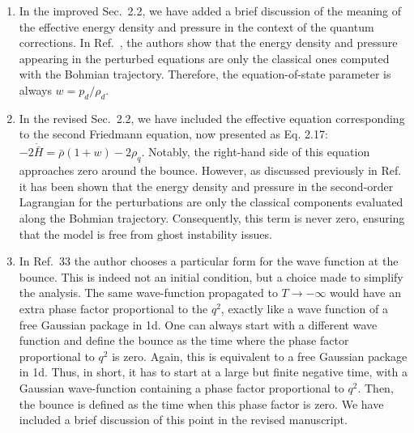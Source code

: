 \documentclass[a4paper,11pt]{article}
\begin{document}
\begin{enumerate}
\begin{enumerate}
              \item In the improved Sec.~2.2, we have added a brief discussion of the
                    meaning of the effective energy density and pressure in the context
                    of the quantum corrections. In Ref.~\cite{fluidgeral}, the authors
                    show that the energy density and pressure appearing in the perturbed
                    equations are only the classical ones computed with the Bohmian
                    trajectory. Therefore, the equation-of-state parameter is always
                    $w=p_d/\rho_d$.

              \item In the revised Sec.~2.2, we have included the effective equation
                    corresponding to the second Friedmann equation, now presented as Eq. 2.17:
                    $-2\dot{\bar{H}} = \bar{\rho}(1+w) - 2\rho_q.$
                    Notably, the right-hand side of this equation approaches zero around the
                    bounce. However, as discussed previously in Ref.~\cite{fluidgeral} it
                    has been shown that the energy density and pressure in the second-order
                    Lagrangian for the perturbations are only the classical components
                    evaluated along the Bohmian trajectory. Consequently, this term is never
                    zero, ensuring that the model is free from ghost instability issues.
              \item In Ref.~33 the author chooses a particular form for the wave
                    function at the bounce. This is indeed not an initial condition, but
                    a choice made to simplify the analysis. The same wave-function
                    propagated to $T\to-\infty$ would have an extra phase factor
                    proportional to the $q^2$, exactly like a wave function of a
                    free Gaussian package in 1d. One can always start with a different
                    wave function and define the bounce as the time where the phase
                    factor proportional to $q^2$ is zero. Again, this is equivalent to a
                    free Gaussian package in 1d. Thus, in short, it has to start at a large
                    but finite negative time, with a Gaussian wave-function containing a
                    phase factor proportional to $q^2$. Then, the bounce is defined as
                    the time when this phase factor is zero. We have included a brief
                    discussion of this point in the revised manuscript.

\end{enumerate}
\end{enumerate}
\end{document}
